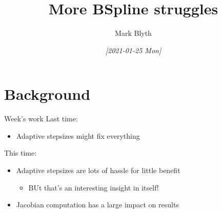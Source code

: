 \documentclass[presentation]{beamer}
\author{Mark Blyth}
\date{\textit{[2021-01-25 Mon]}}
\title{More BSpline struggles}
\begin{document}
\maketitle

\section{Background}
\label{sec:org049e47e}
\begin{frame}[label={sec:org4d937ae}]{Week's work}
Last time:
\begin{itemize}
\item Adaptive stepsizes might fix everything
\end{itemize}
\vfill
This time:
\begin{itemize}
\item Adaptive stepsizes are lots of hassle for little benefit
\begin{itemize}
\item BUt that's an interesting insight in itself!
\end{itemize}
\item Jacobian computation has a large impact on results
\end{itemize}
\end{frame}
\end{document}
